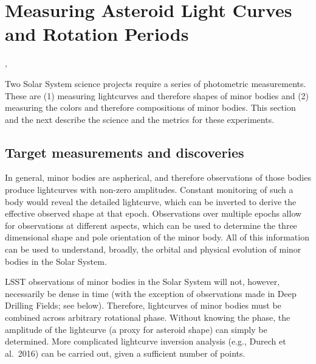 %
%

\section{Measuring Asteroid Light Curves and Rotation Periods}
\def\secname{\chpname:lightcurves}\label{sec:\secname}

,

Two Solar System science projects require a series of photometric
measurements. These are (1) measuring lightcurves and therefore shapes
of minor bodies and (2) measuring the colors and therefore compositions
of minor bodies. This section and the next describe the science and the
metrics for these experiments.


\subsection{Target measurements and discoveries}
\label{sec:\secname:targets}

In general, minor bodies are aspherical, and therefore observations of
those bodies produce lightcurves with non-zero amplitudes. Constant
monitoring of such a body would reveal the detailed lightcurve, which
can be inverted to derive the effective observed shape at that epoch.
Observations over multiple epochs allow for observations at different
aspects, which can be used to determine the three dimensional shape and
pole orientation of the minor body. All of this information can be used
to understand, broadly, the orbital and physical evolution of minor
bodies in the Solar System.

LSST observations of minor bodies in the Solar System will not, however,
necessarily be dense in time (with the exception of observations made in
Deep Drilling Fields; see below). Therefore, lightcurves of minor bodies
must be combined across arbitrary rotational phase. Without knowing the
phase, the amplitude of the lightcurve (a proxy for asteroid shape) can
simply be determined. More complicated lightcurve inversion analysis
(e.g., Durech et al.\ 2016)
can be carried out, given a sufficient number of points.


